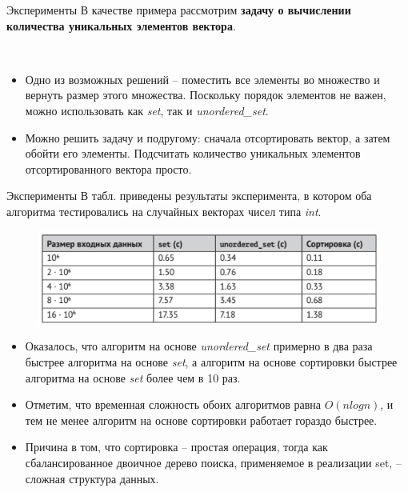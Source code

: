 \documentclass{beamer}
\begin{document}
\begin{frame}[fragile]{Эксперименты}
    В качестве примера рассмотрим \textbf{задачу о вычислении количества уникальных элементов вектора}. 
    
    ~
    
    \begin{itemize}
        \item Одно из возможных решений – поместить все элементы во множество и вернуть размер этого множества. Поскольку порядок элементов не важен, можно использовать как \textit{set}, так и \textit{unordered\_set}. 
        \item  Можно решить задачу и по­другому: сначала отсортировать вектор, а затем обойти его элементы. Подсчитать количество уникальных элементов отсортированного вектора просто.
    \end{itemize}
    
\end{frame}

\begin{frame}[fragile]{Эксперименты}
    В табл. приведены результаты эксперимента, в котором оба алгоритма тестировались на случайных векторах чисел типа \textit{int}. 
    
	\begin{figure}[h]
		\centering
		\includegraphics[scale=0.75]{images/lec11-pic02.png}
	\end{figure}

    \begin{itemize}
        \item Оказалось, что алгоритм на основе \textit{unordered\_set} примерно в два раза быстрее алгоритма на основе \textit{set}, а алгоритм на основе сортировки быстрее алгоритма на основе \textit{set} более чем в 10 раз.
        \item Отметим, что временная сложность обоих алгоритмов равна $O(n log n)$, и тем не менее алгоритм на основе сортировки работает гораздо быстрее. 
        \item Причина в том, что сортировка -- простая операция, тогда как сбалансированное двоичное дерево поиска, применяемое в реализации set, – сложная структура данных.
    \end{itemize}
    
\end{frame}
\end{document}
